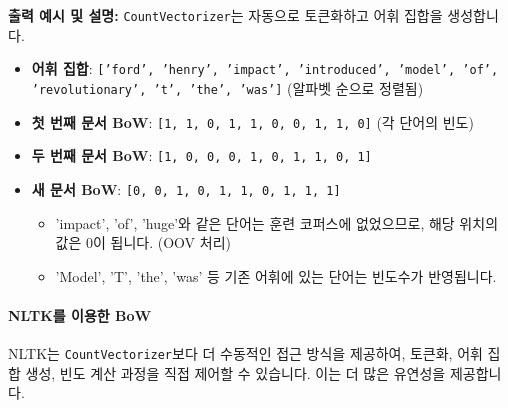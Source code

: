 \documentclass[11pt,a4paper]{article}
\theoremstyle{definition}
\begin{document}
\begin{tcolorbox}[examplebox, title=\textbf{예시}]
\textbf{출력 예시 및 설명:}
\texttt{CountVectorizer}는 자동으로 토큰화하고 어휘 집합을 생성합니다.
\begin{itemize}
    \item \textbf{어휘 집합}: \texttt{['ford', 'henry', 'impact', 'introduced', 'model', 'of', 'revolutionary', 't', 'the', 'was']} (알파벳 순으로 정렬됨)
    \item \textbf{첫 번째 문서 BoW}: \texttt{[1, 1, 0, 1, 1, 0, 0, 1, 1, 0]} (각 단어의 빈도)
    \item \textbf{두 번째 문서 BoW}: \texttt{[1, 0, 0, 0, 1, 0, 1, 1, 0, 1]}
    \item \textbf{새 문서 BoW}: \texttt{[0, 0, 1, 0, 1, 1, 0, 1, 1, 1]}
        \begin{itemize}
            \item 'impact', 'of', 'huge'와 같은 단어는 훈련 코퍼스에 없었으므로, 해당 위치의 값은 0이 됩니다. (OOV 처리)
            \item 'Model', 'T', 'the', 'was' 등 기존 어휘에 있는 단어는 빈도수가 반영됩니다.
        \end{itemize}
\end{itemize}
\end{tcolorbox}

\paragraph{NLTK를 이용한 BoW}
NLTK는 \texttt{CountVectorizer}보다 더 수동적인 접근 방식을 제공하여, 토큰화, 어휘 집합 생성, 빈도 계산 과정을 직접 제어할 수 있습니다. 이는 더 많은 유연성을 제공합니다.
\end{document}
